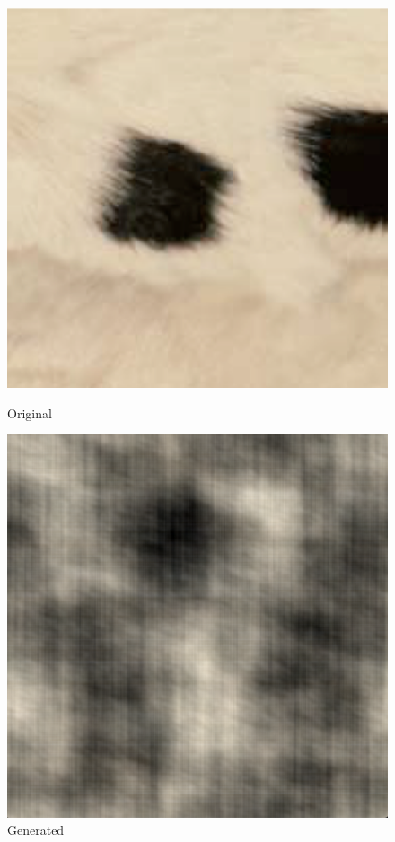 \documentclass{article}
\begin{document}
    \begin{figure}[!htb]
    \begin{center}
      \includegraphics[scale=.35]{5/report/random/11.png}
      \caption{Original}
    \end{center}
    \endminipage \hfill
    \begin{center}
      \includegraphics[scale=.35]{5/report/random/11_c.png}
      \caption{Generated}
    \end{center}
    \endminipage
    \end{figure}    
\end{document}
